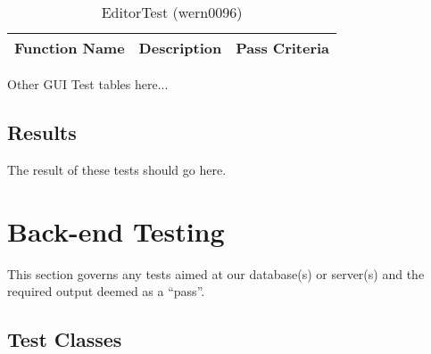 \documentclass[14pt, a4paper]{article}
\begin{document}
\begin{table}[h]
	\centering	
	\caption{EditorTest (wern0096)}
	\begin{tabular}{|p{4cm}|p{5cm}|p{6cm}|} 
		\hline
		\textbf{Function Name} & \textbf{Description} & \textbf{Pass Criteria}  \\\hline
	\end{tabular}
\end{table}

Other GUI Test tables here...\\



\newpage
\subsection{Results}

The result of these tests should go here.


\newpage
\section{Back-end Testing}

This section governs any tests aimed at our database(s) or server(s) and the required output deemed as a ``pass''. \\

\subsection{Test Classes}
\end{document}
